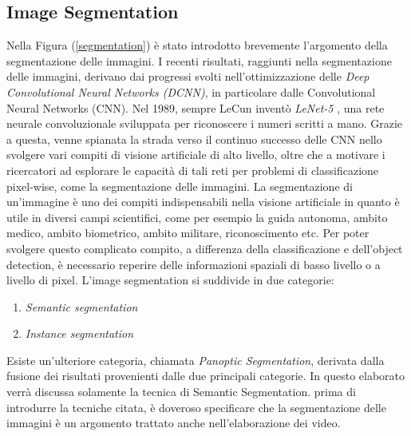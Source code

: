 \subsection{Image Segmentation}
Nella Figura (\ref{segmentation}) è stato introdotto brevemente l'argomento della segmentazione 
delle immagini.  I recenti risultati, raggiunti nella segmentazione delle immagini, 
derivano dai progressi svolti nell'ottimizzazione delle \emph{Deep Convolutional Neural 
Networks (DCNN)}, in particolare dalle Convolutional Neural Networks (CNN). 
Nel 1989, sempre LeCun inventò \emph{LeNet-5} \cite{LeNet-5}, una rete neurale convoluzionale 
sviluppata per riconoscere i numeri scritti a mano. Grazie a questa, venne spianata 
la strada verso il continuo successo delle CNN nello svolgere vari compiti di visione 
artificiale di alto livello, oltre che a motivare i ricercatori ad esplorare le capacità 
di tali reti per problemi di classificazione pixel-wise, come la segmentazione delle 
immagini. La segmentazione di un'immagine è uno dei  compiti indispensabili 
nella visione artificiale in quanto è utile in diversi campi scientifici, come per 
esempio la guida autonoma, ambito medico, ambito biometrico, ambito militare, 
riconoscimento etc. Per poter svolgere questo complicato compito, a differenza 
della classificazione e dell'object detection, è necessario reperire delle informazioni 
spaziali di basso livello o a livello di pixel.
L'image segmentation si suddivide in due categorie:
\begin{enumerate}
    \item \emph{Semantic segmentation}
    \item \emph{Instance segmentation}
\end{enumerate}
Esiste un'ulteriore categoria, chiamata \emph{Panoptic Segmentation}, derivata dalla 
fusione dei risultati provenienti dalle due principali categorie. In questo elaborato 
verrà discussa solamente la tecnica di Semantic Segmentation. prima di introdurre 
la tecniche citata, è doveroso specificare che la segmentazione delle immagini è 
un argomento trattato anche nell'elaborazione dei video.

